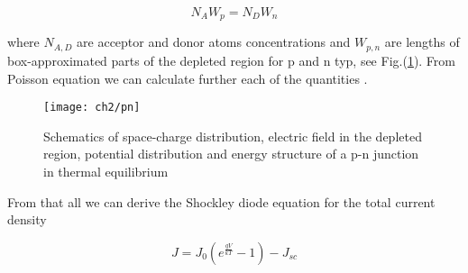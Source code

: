 \begin{equation}
N_AW_p=N_DW_n
\end{equation}

where $N_{A,D}$ are acceptor and donor atoms concentrations and $W_{p,n}$ are lengths of box-approximated parts of the depleted region for p and n typ, see Fig.(\ref{fig:pn}). From Poisson equation we can calculate further each of the quantities \cite{sze}.

\begin{figure}
\centering
\texttt{[image: ch2/pn]}
\caption{Schematics of space-charge distribution, electric field in the depleted region, potential distribution and energy structure of a p-n junction in thermal equilibrium}
\label{fig:pn}
\end{figure}

From that all we can derive the Shockley diode equation for the total current density\cite{pv}

\begin{equation}
J = J_0(e^{\frac{qV}{kT}}-1) - J_{sc}
\end{equation}
